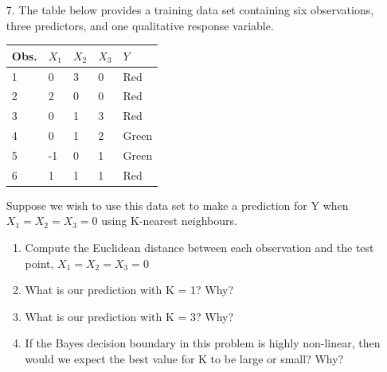 \documentclass[12pt,a4paper]{article}%
\theoremstyle{definition}
\theoremstyle{plain}
\numberwithin{equation}{section}
\begin{document}
\begin{enumerate}
\item[7.] The table below provides a training data set containing six observations, three predictors, and one qualitative response variable.

\begin{table}[H]
\centering
\begin{tabular}{lllll}
Obs.  & $X_{1}$    & $X_{2}$     & $X_{3}$  & $Y$ \\
\toprule
1 & 0 & 3 & 0 & Red \\
2 & 2 & 0 & 0 & Red \\
3 & 0 & 1 & 3 & Red \\
4 & 0 & 1 & 2 & Green \\
5 & -1 & 0 & 1 & Green \\
6 & 1 & 1 & 1 & Red \\
\bottomrule
\end{tabular}
\end{table}
Suppose we wish to use this data set to make a prediction for Y when $X_{1} = X_{2} = X_{3} = 0$ using K-nearest neighbours.
    \begin{enumerate}
        \item Compute the Euclidean distance between each observation and the test point, $X_{1} = X_{2} = X_{3} = 0$
        \item What is our prediction with K = 1? Why?
        \item What is our prediction with K = 3? Why?
        \item If the Bayes decision boundary in this problem is highly non-linear, then would we expect the best value for K to be large or small? Why?
    \end{enumerate}
\end{enumerate}
\end{document}
